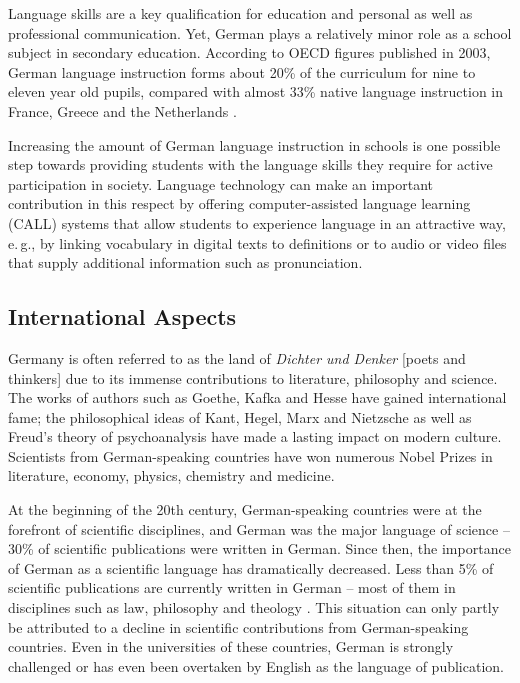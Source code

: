 \documentclass[]{../../metanetpaper}
\begin{document}
\begin{multicols}{2}

Language skills are a key qualification for education and personal as well as professional communication. Yet, German plays a relatively minor role as a school subject in secondary education. According to OECD figures published in 2003, German language instruction forms about 20\% of the curriculum for nine to eleven year old pupils, compared with almost 33\% native language instruction in France, Greece and the Netherlands \cite{kmk1}.

Increasing the amount of German language instruction in schools is one possible step towards providing students with the language skills they require for active participation in society. Language technology can make an important contribution in this respect by offering computer-assisted language learning (CALL) systems that allow students to experience language in an attractive way, e.\,g., by linking vocabulary in digital texts to definitions or to audio or video files that supply additional information such as pronunciation.

\subsection{International Aspects}

Germany is often referred to as the land of \textit{Dichter und Denker} [poets and thinkers] due to its immense contributions to literature, philosophy and science. The works of authors such as Goethe, Kafka and Hesse have gained international fame; the philosophical ideas of Kant, Hegel, Marx and Nietzsche as well as Freud's theory of psychoanalysis have made a lasting impact on modern culture. Scientists from German-speaking countries have won numerous Nobel Prizes in literature, economy, physics, chemistry and medicine.

At the beginning of the 20th century, German-speaking countries were at the forefront of scientific disciplines, and German was the major language of science -- 30\% of scientific publications were written in German. Since then, the importance of German as a scientific language has dramatically decreased. Less than 5\% of scientific publications are currently written in German -- most of them in disciplines such as law, philosophy and theology \cite{joy1}. This situation can only partly be attributed to a decline in scientific contributions from German-speaking countries. Even in the universities of these countries, German is strongly challenged or has even been overtaken by English as the language of publication.


\end{multicols}
\end{document}
